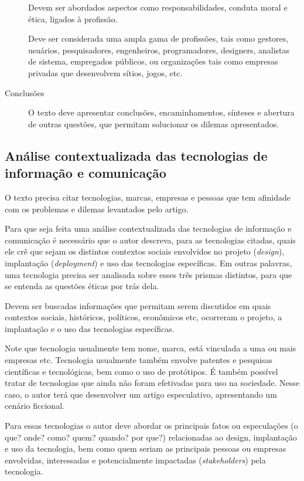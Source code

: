 \documentclass[12pt]{article}
\begin{document}
\begin{description}
		Devem ser abordados aspectos como responsabilidades, conduta moral e ética, ligados à profissão.
		
		Deve ser considerada uma ampla gama de profissões, tais como gestores, usuários, pesquisadores, engenheiros, programadores, designers, analistas de sistema, empregados públicos, ou organizações tais como empresas privadas que desenvolvem sítios, jogos, etc.
		\item [Conclusões] O texto deve apresentar conclusões, encaminhamentos, sínteses e abertura de outras questões, que permitam solucionar os dilemas apresentados.
		
	\end{description}
	
	\subsection{\label{tecno}Análise contextualizada das tecnologias de informação e comunicação}
	
	O texto precisa citar tecnologias, marcas, empresas e pessoas que tem afinidade com os problemas e dilemas levantados pelo artigo.
	
	Para que seja feita uma análise contextualizada das tecnologias de informação e comunicação é necessário que o autor descreva, para as tecnologias citadas, quais ele crê que sejam os distintos contextos sociais envolvidos no projeto (\textit{design}), implantação (\textit{deployment}) e uso das tecnologias específicas. Em outras palavras, uma tecnologia precisa ser analisada sobre esses três prismas distintos, para que se entenda as questões éticas por trás dela.
	
	Devem ser buscadas informações que permitam serem discutidos em quais contextos sociais, históricos, políticos, econômicos etc, ocorreram o projeto, a implantação e o uso das tecnologias específicas.
	
	Note que tecnologia usualmente tem nome, marca, está vinculada a uma ou mais empresas etc. Tecnologia usualmente também envolve patentes e pesquisas científicas e tecnológicas, bem como o uso de protótipos. É também possível tratar de tecnologias que ainda não foram efetivadas para uso na sociedade. Nesse caso, o autor terá que desenvolver um artigo especulativo, apresentando um cenário ficcional.
	
	Para essas tecnologias o autor deve abordar os principais fatos ou especulações (o que? onde? como? quem? quando? por que?) relacionadas ao design, implantação e uso da tecnologia, bem como quem seriam as principais pessoas ou empresas envolvidas, interessadas e potencialmente impactadas (\textit{stakeholders}) pela tecnologia.
	
\end{document}
